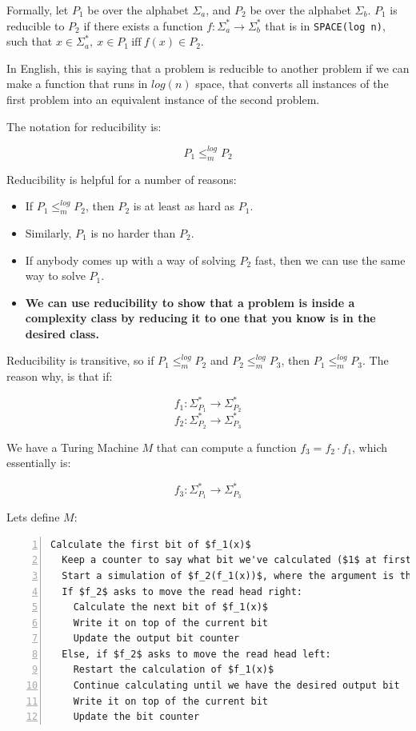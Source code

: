 Formally, let $P_1$ be over the alphabet $\Sigma_a$, and $P_2$ be over the
alphabet $\Sigma_b$. $P_1$ is reducible to $P_2$ if there exists a function $f :
\Sigma^*_a \rightarrow \Sigma^*_b$ that is in \texttt{SPACE(log n)}, such that
$x \in \Sigma^*_a,~x \in P_1~\text{iff}~f(x)\in P_2$.

In English, this is saying that a problem is reducible to another problem if we
can make a function that runs in $log(n)$ space, that converts all instances of
the first problem into an equivalent instance of the second problem.

The notation for reducibility is:


\[
  P_1 \leq^{log}_m P_2
\]

Reducibility is helpful for a number of reasons:

\begin{itemize}
  \item If $P_1 \leq^{log}_m P_2$, then $P_2$ is at least as hard as $P_1$.
  \item Similarly, $P_1$ is no harder than $P_2$.
  \item If anybody comes up with a way of solving $P_2$ fast, then we can use 
    the same way to solve $P_1$.
  \item \textbf{We can use reducibility to show that a problem is inside a 
    complexity class by reducing it to one that you know is in the desired
    class.}
\end{itemize}

Reducibility is transitive, so if $P_1 \leq^{log}_m P_2$ and $P_2 \leq^{log}_m P_3$, then $P_1 \leq^{log}_m P_3$. The reason why, is that if:

\[
  f_1 : \Sigma^*_{P_1} \rightarrow \Sigma^*_{P_2}
\]
\[
  f_2 : \Sigma^*_{P_2} \rightarrow \Sigma^*_{P_3}
\]

We have a Turing Machine $M$ that can compute a function $f_3 = f_2 \cdot f_1$,
which essentially is:

\[
  f_3 : \Sigma^*_{P_1} \rightarrow \Sigma^*_{P_3}
\]

Lets define $M$:

\begin{lstlisting}[numbers=left,mathescape]
  Calculate the first bit of $f_1(x)$
  Keep a counter to say what bit we've calculated ($1$ at first)
  Start a simulation of $f_2(f_1(x))$, where the argument is the calculated bit
  If $f_2$ asks to move the read head right:
    Calculate the next bit of $f_1(x)$
    Write it on top of the current bit
    Update the output bit counter
  Else, if $f_2$ asks to move the read head left:
    Restart the calculation of $f_1(x)$
    Continue calculating until we have the desired output bit
    Write it on top of the current bit
    Update the bit counter
\end{lstlisting}

